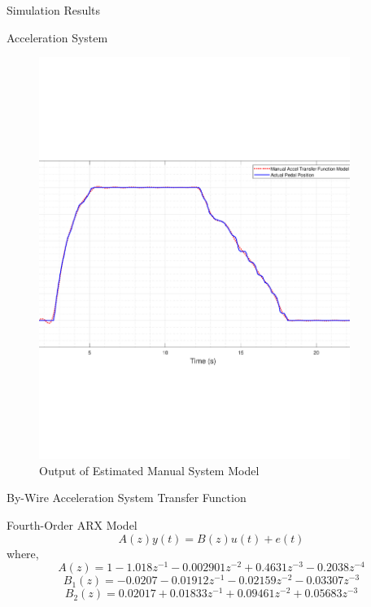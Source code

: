 \documentclass{beamer}
\begin{document}
\begin{frame}{Simulation Results}
\begin{block}{Acceleration System}
\begin{figure}
\begin{minipage}{0.45\textwidth}
        \includegraphics[width=0.9\textwidth]{figs/img/manualAccelTransferFunctionModel} %
        \caption{Output of Estimated Manual System Model}
        \label{fig:manualAccelModel}
    \end{minipage}
\end{figure}
  \end{block}
\end{frame}

\begin{frame}{By-Wire Acceleration System Transfer Function}
	\begin{block}{Fourth-Order ARX Model}
		\begin{equation}
			A(z)y(t) = B(z)u(t) + e(t)
		\end{equation}
		where, 
		\begin{equation}
			A(z) = 1 - 1.018z^{-1} - 0.002901z^{-2} + 0.4631z^{-3} - 0.2038z^{-4}
		\end{equation}
		\begin{equation}
			B_1(z) = -0.0207 - 0.01912z^{-1} - 0.02159z^{-2} - 0.03307z^{-3}
		\end{equation}
		\begin{equation}
			B_2(z) = 0.02017 + 0.01833z^{-1} + 0.09461z^{-2} + 0.05683z^{-3}
		\end{equation}
	\end{block}
\end{frame}
\end{document}
